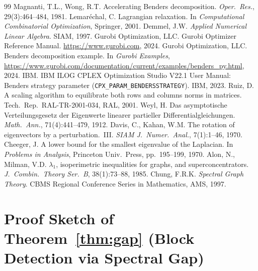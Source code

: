 \documentclass[11pt]{article}
\begin{document}
\begin{thebibliography}{99}
 Magnanti, T.L., Wong, R.T. Accelerating Benders decomposition. \emph{Oper.\ Res.}, 29(3):464--484, 1981.
 Lemar\'{e}chal, C. Lagrangian relaxation. In \emph{Computational Combinatorial Optimization}, Springer, 2001.
 Demmel, J.W. \emph{Applied Numerical Linear Algebra}. SIAM, 1997.
 Gurobi Optimization, LLC. Gurobi Optimizer Reference Manual. \url{https://www.gurobi.com}, 2024.
 Gurobi Optimization, LLC. Benders decomposition example. In \emph{Gurobi Examples}, \url{https://www.gurobi.com/documentation/current/examples/benders_py.html}, 2024.
 IBM. IBM ILOG CPLEX Optimization Studio V22.1 User Manual: Benders strategy parameter (\texttt{CPX\_PARAM\_BENDERSSTRATEGY}). IBM, 2023.
 Ruiz, D. A scaling algorithm to equilibrate both rows and columns norms in matrices. Tech.\ Rep.\ RAL-TR-2001-034, RAL, 2001.
 Weyl, H. Das asymptotische Verteilungsgesetz der Eigenwerte linearer partieller Differentialgleichungen. \emph{Math.\ Ann.}, 71(4):441--479, 1912.
 Davis, C., Kahan, W.M. The rotation of eigenvectors by a perturbation.\ III. \emph{SIAM J.\ Numer.\ Anal.}, 7(1):1--46, 1970.
 Cheeger, J. A lower bound for the smallest eigenvalue of the Laplacian. In \emph{Problems in Analysis}, Princeton Univ.\ Press, pp.\ 195--199, 1970.
 Alon, N., Milman, V.D. $\lambda_1$, isoperimetric inequalities for graphs, and superconcentrators. \emph{J.\ Combin.\ Theory Ser.\ B}, 38(1):73--88, 1985.
 Chung, F.R.K. \emph{Spectral Graph Theory}. CBMS Regional Conference Series in Mathematics, AMS, 1997.
\end{thebibliography}

\appendix
\section{Proof Sketch of Theorem~\ref{thm:gap} (Block Detection via Spectral Gap)}
\label{app:gap-proof}
\end{document}
